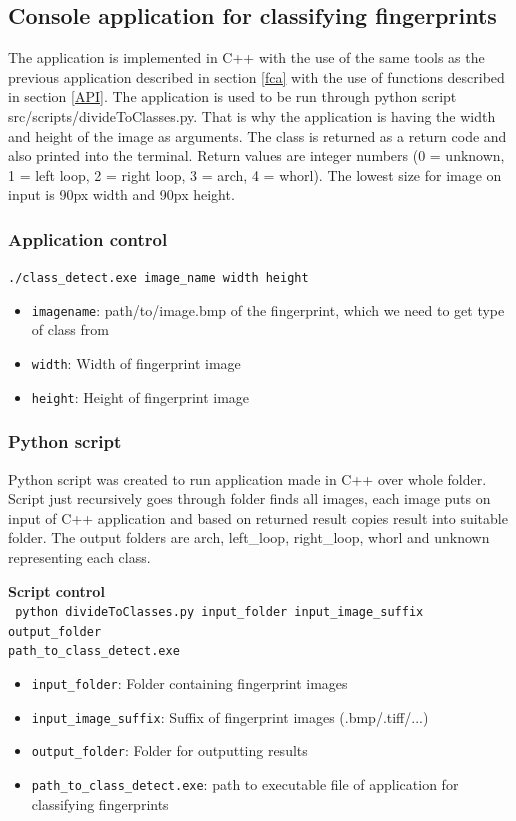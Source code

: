 \label{clasifyApp}
\subsection{Console application for classifying fingerprints}
The application is implemented in C++ with the use of the same tools as the previous application described in section \ref{fca} with the use of functions described in section \ref{API}. The application is used to be run through python script src/scripts/divideToClasses.py. That is why the application is having the width and height of the image as arguments. The class is returned as a return code and also printed into the terminal. Return values are integer numbers (0 = unknown, 1 = left loop, 2 = right loop, 3 = arch, 4 = whorl). The lowest size for image on input is 90px width and 90px height.

\subsubsection{Application control}
\texttt{./class\_detect.exe image\_name width height}
\begin{itemize}
    \item \texttt{imagename}: path/to/image.bmp of the fingerprint, which we need to get type of class from
    \item \texttt{width}: Width of fingerprint image
    \item \texttt{height}: Height of fingerprint image
\end{itemize}

\label{classscript}
\subsubsection{Python script}
Python script was created to run application made in C++ over whole folder. Script just recursively goes through folder finds all images, each image puts on input of C++ application and based on returned result copies result into suitable folder. The output folders are arch, left\_loop, right\_loop, whorl and unknown representing each class. 

\textbf{Script control}\\
\texttt{ python divideToClasses.py input\_folder input\_image\_suffix output\_folder \\ path\_to\_class\_detect.exe}
\begin{itemize}
	\item \texttt{input\_folder}: Folder containing fingerprint images
	\item \texttt{input\_image\_suffix}: Suffix of fingerprint images (.bmp/.tiff/...)
	\item \texttt{output\_folder}: Folder for outputting results
	\item \texttt{path\_to\_class\_detect.exe}: path to executable file of application for classifying fingerprints
\end{itemize}

